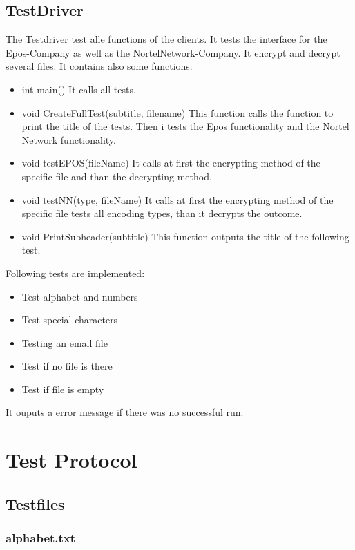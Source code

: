 \subsection{TestDriver}
The Testdriver test alle functions of the clients. It tests the interface for the Epos-Company as well as the NortelNetwork-Company. It encrypt and decrypt several files. It contains also some functions:
\begin{itemize}
\item int main()
\subitem It calls all tests.

\item void CreateFullTest(subtitle, filename)
\subitem This function calls the function to print the title of the tests. Then i tests the Epos functionality and the Nortel Network functionality.

\item void testEPOS(fileName)
\subitem It calls at first the encrypting method of the specific file and than the decrypting method.

\item void testNN(type, fileName)
\subitem It calls at first the encrypting method of the specific file tests all encoding types, than it decrypts the outcome.

\item void PrintSubheader(subtitle)
\subitem This function outputs the title of the following test.
\end{itemize}
Following tests are implemented:
\begin{itemize}
\item Test alphabet and numbers
\item Test special characters
\item Testing an email file
\item Test if no file is there
\item Test if file is empty
\end{itemize}
It ouputs a error message if there was no successful run.

\newpage
\section{Test Protocol}

\subsection{Testfiles}
\subsubsection{alphabet.txt}
